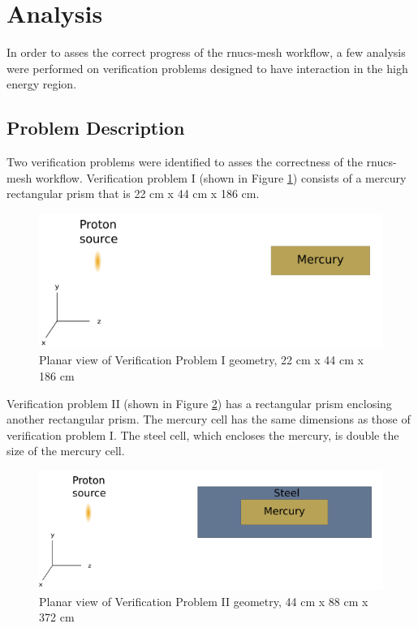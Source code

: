 \section{Analysis}\label{sc:analysis}
In order to asses the correct progress of the rnucs-mesh workflow, a few 
analysis were performed on verification problems designed to have interaction in the 
high energy region. 

\subsection{Problem Description}
Two verification problems were identified to asses the correctness of the 
rnucs-mesh workflow. 
Verification problem I (shown in Figure \ref{TPI}) consists of a mercury rectangular prism that is 
22 cm x 44 cm x 186 cm. 

\begin{figure}[h!]
\begin{centering}
\includegraphics[width=0.60\linewidth]{../figs/mercury.png}
\caption{Planar view of Verification Problem I geometry, 22 cm  x 44 cm x 186 cm }
\label{TPI}
\end{centering}
\end{figure}
Verification problem II (shown in Figure \ref{TPII}) has a rectangular prism enclosing another rectangular
prism. 
The mercury cell has the same dimensions as those of verification problem I. The steel 
cell, which encloses the mercury, is double the size of the mercury cell. 
\begin{figure}[h!]
\begin{centering}
\includegraphics[width=0.70\linewidth]{../figs/mer_steel.png}
\caption{Planar view of Verification Problem II geometry, 44 cm  x 88 cm x 372 cm }
\label{TPII}
\end{centering}
\end{figure}

